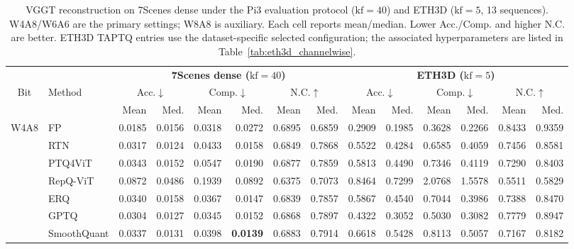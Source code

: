 \documentclass[journal]{Tail_Aware_Post_Training_Quantization_for_3D_Geometry_Models_TMM/IEEEtran}
\begin{document}
\begin{table}[t]
\caption{VGGT reconstruction on 7Scenes dense under the Pi3 evaluation protocol ($\mathrm{kf}=40$) and ETH3D ($\mathrm{kf}=5$, 13 sequences). W4A8/W6A6 are the primary settings; W8A8 is auxiliary. Each cell reports mean/median. Lower Acc./Comp. and higher N.C. are better. ETH3D TAPTQ entries use the dataset-specific selected configuration; the associated hyperparameters are listed in Table~\ref{tab:eth3d_channelwise}.}
\label{tab:vggt_main_results}
\centering
\fontsize{6.4}{7.5}\selectfont
\setlength{\tabcolsep}{2.0pt}
\renewcommand{\arraystretch}{1.08}
\begin{tabular}{@{}cl|rrrrrr|rrrrrr@{}}
\toprule
& & \multicolumn{6}{c}{\textbf{7Scenes dense ($\mathrm{kf}=40$)}} & \multicolumn{6}{c}{\textbf{ETH3D ($\mathrm{kf}=5$)}} \\
\cmidrule(lr){3-8}\cmidrule(lr){9-14}
\multirow{2}{*}{Bit} & \multirow{2}{*}{Method}
& \multicolumn{2}{c}{Acc.$\downarrow$} & \multicolumn{2}{c}{Comp.$\downarrow$} & \multicolumn{2}{c}{N.C.$\uparrow$}
& \multicolumn{2}{c}{Acc.$\downarrow$} & \multicolumn{2}{c}{Comp.$\downarrow$} & \multicolumn{2}{c}{N.C.$\uparrow$} \\
\cmidrule(lr){3-4}\cmidrule(lr){5-6}\cmidrule(lr){7-8}\cmidrule(lr){9-10}\cmidrule(lr){11-12}\cmidrule(lr){13-14}
& & Mean & Med. & Mean & Med. & Mean & Med. & Mean & Med. & Mean & Med. & Mean & Med. \\
\midrule
\multirow{9}{*}{W4A8}
& FP          & 0.0185 & 0.0156 & 0.0318 & 0.0272 & 0.6895 & 0.6859 & 0.2909 & 0.1985 & 0.3628 & 0.2266 & 0.8433 & 0.9359 \\
& RTN         & 0.0317 & 0.0124 & 0.0433 & 0.0158 & 0.6849 & 0.7868 & 0.5522 & 0.4284 & 0.6585 & 0.4059 & 0.7456 & 0.8581 \\
& PTQ4ViT     & 0.0343 & 0.0152 & 0.0547 & 0.0190 & 0.6877 & 0.7859 & 0.5813 & 0.4490 & 0.7346 & 0.4119 & 0.7290 & 0.8403 \\
& RepQ-ViT    & 0.0872 & 0.0486 & 0.1939 & 0.0892 & 0.6375 & 0.7073 & 0.8464 & 0.7299 & 2.0768 & 1.5578 & 0.5511 & 0.5829 \\
& ERQ         & 0.0340 & 0.0158 & 0.0367 & 0.0147 & 0.6839 & 0.7857 & 0.5867 & 0.4540 & 0.7044 & 0.3986 & 0.7388 & 0.8470 \\
& GPTQ        & 0.0304 & 0.0127 & 0.0345 & 0.0152 & 0.6868 & 0.7897 & 0.4322 & 0.3052 & 0.5030 & 0.3082 & 0.7779 & 0.8947 \\
& SmoothQuant & 0.0337 & 0.0131 & 0.0398 & \textbf{0.0139} & 0.6883 & 0.7914 & 0.6618 & 0.5428 & 0.8113 & 0.5057 & 0.7167 & 0.8182 \\

\end{tabular}
\end{table}
\end{document}
